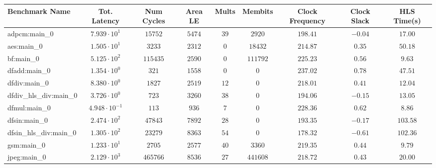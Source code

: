 \begin{tabular}{|l|c|c|c|c|c|c|c|c|}
\hline
Benchmark Name          & Tot. Latency            & Num Cycles & Area LE   & Mults   & Membits    & Clock Frequency & Clock Slack & HLS Time(s) \\
\hline
adpcm:main\_0           & $ 7.939 \cdot 10^{1}  $ & $ 15752  $ & $ 5474  $ & $ 39  $ & $ 2920   $ & $ 198.41      $ & $ -0.04   $ & $ 17.00   $ \\
aes:main\_0             & $ 1.505 \cdot 10^{1}  $ & $ 3233   $ & $ 2312  $ & $ 0   $ & $ 18432  $ & $ 214.87      $ & $ 0.35    $ & $ 50.18   $ \\
bf:main\_0              & $ 5.125 \cdot 10^{2}  $ & $ 115435 $ & $ 2590  $ & $ 0   $ & $ 111792 $ & $ 225.23      $ & $ 0.56    $ & $ 9.63    $ \\
dfadd:main\_0           & $ 1.354 \cdot 10^{0}  $ & $ 321    $ & $ 1558  $ & $ 0   $ & $ 0      $ & $ 237.02      $ & $ 0.78    $ & $ 47.51   $ \\
dfdiv:main\_0           & $ 8.380 \cdot 10^{0}  $ & $ 1827   $ & $ 2519  $ & $ 12  $ & $ 0      $ & $ 218.01      $ & $ 0.41    $ & $ 12.04   $ \\
dfdiv\_hls\_div:main\_0 & $ 3.726 \cdot 10^{0}  $ & $ 723    $ & $ 3260  $ & $ 38  $ & $ 0      $ & $ 194.06      $ & $ -0.15   $ & $ 13.05   $ \\
dfmul:main\_0           & $ 4.948 \cdot 10^{-1} $ & $ 113    $ & $ 936   $ & $ 7   $ & $ 0      $ & $ 228.36      $ & $ 0.62    $ & $ 8.86    $ \\
dfsin:main\_0           & $ 2.474 \cdot 10^{2}  $ & $ 47843  $ & $ 7892  $ & $ 28  $ & $ 0      $ & $ 193.35      $ & $ -0.17   $ & $ 103.58  $ \\
dfsin\_hls\_div:main\_0 & $ 1.305 \cdot 10^{2}  $ & $ 23279  $ & $ 8363  $ & $ 54  $ & $ 0      $ & $ 178.32      $ & $ -0.61   $ & $ 102.36  $ \\
gsm:main\_0             & $ 1.233 \cdot 10^{1}  $ & $ 2705   $ & $ 2577  $ & $ 40  $ & $ 3360   $ & $ 219.35      $ & $ 0.44    $ & $ 9.79    $ \\
jpeg:main\_0            & $ 2.129 \cdot 10^{3}  $ & $ 465766 $ & $ 8536  $ & $ 27  $ & $ 441608 $ & $ 218.72      $ & $ 0.43    $ & $ 20.00   $ \\

\end{tabular}
